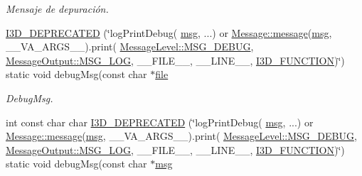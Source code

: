 \begin{DoxyCompactItemize}
\begin{DoxyCompactList}\small\item\em Mensaje de depuración. \end{DoxyCompactList}\item 
\hyperlink{class_i3_d_1_1_log_msg_a17cce8fb482ad6bcfc0f3accd5d1a33b}{I3\+D\+\_\+\+D\+E\+P\+R\+E\+C\+A\+T\+ED} (\char`\"{}log\+Print\+Debug( \hyperlink{class_i3_d_1_1_log_msg_a5a1ceb27d9529de8eb9b3fc9377e178a}{msg}, ...) or \hyperlink{class_i3_d_1_1_message_a525f877a41a1e7493188b2b720d1d254}{Message\+::message}(\hyperlink{class_i3_d_1_1_log_msg_a5a1ceb27d9529de8eb9b3fc9377e178a}{msg}, \+\_\+\+\_\+\+V\+A\+\_\+\+A\+R\+G\+S\+\_\+\+\_\+).print( \hyperlink{namespace_i3_d_a1c1740d2076e09b1a37b82e45a0327b5a918e87a1f80863c7ee35bfa2c58cc41e}{Message\+Level\+::\+M\+S\+G\+\_\+\+D\+E\+B\+UG}, \hyperlink{namespace_i3_d_a2ccb65ac6e08844c1175a235107fa103a8c1a4761ebfadb227927517230ff7b02}{Message\+Output\+::\+M\+S\+G\+\_\+\+L\+OG}, \+\_\+\+\_\+\+F\+I\+L\+E\+\_\+\+\_\+, \+\_\+\+\_\+\+L\+I\+N\+E\+\_\+\+\_\+, \hyperlink{defs_8h_acd64dca6972802e8d77a78d3efcca04a}{I3\+D\+\_\+\+F\+U\+N\+C\+T\+I\+ON})\char`\"{}) static void debug\+Msg(const char $\ast$\hyperlink{class_i3_d_1_1_log_msg_ab59f20d39ef112d2196371ae0636d77c}{file}
\begin{DoxyCompactList}\small\item\em Debug\+Msg. \end{DoxyCompactList}\item 
int const char char \hyperlink{class_i3_d_1_1_log_msg_a4bb9bcc06243caa8745dd7e4dda702e0}{I3\+D\+\_\+\+D\+E\+P\+R\+E\+C\+A\+T\+ED} (\char`\"{}log\+Print\+Debug( \hyperlink{class_i3_d_1_1_log_msg_a5a1ceb27d9529de8eb9b3fc9377e178a}{msg}, ...) or \hyperlink{class_i3_d_1_1_message_a525f877a41a1e7493188b2b720d1d254}{Message\+::message}(\hyperlink{class_i3_d_1_1_log_msg_a5a1ceb27d9529de8eb9b3fc9377e178a}{msg}, \+\_\+\+\_\+\+V\+A\+\_\+\+A\+R\+G\+S\+\_\+\+\_\+).print( \hyperlink{namespace_i3_d_a1c1740d2076e09b1a37b82e45a0327b5a918e87a1f80863c7ee35bfa2c58cc41e}{Message\+Level\+::\+M\+S\+G\+\_\+\+D\+E\+B\+UG}, \hyperlink{namespace_i3_d_a2ccb65ac6e08844c1175a235107fa103a8c1a4761ebfadb227927517230ff7b02}{Message\+Output\+::\+M\+S\+G\+\_\+\+L\+OG}, \+\_\+\+\_\+\+F\+I\+L\+E\+\_\+\+\_\+, \+\_\+\+\_\+\+L\+I\+N\+E\+\_\+\+\_\+, \hyperlink{defs_8h_acd64dca6972802e8d77a78d3efcca04a}{I3\+D\+\_\+\+F\+U\+N\+C\+T\+I\+ON})\char`\"{}) static void debug\+Msg(const char $\ast$\hyperlink{class_i3_d_1_1_log_msg_a5a1ceb27d9529de8eb9b3fc9377e178a}{msg}
\item 

\end{DoxyCompactItemize}
